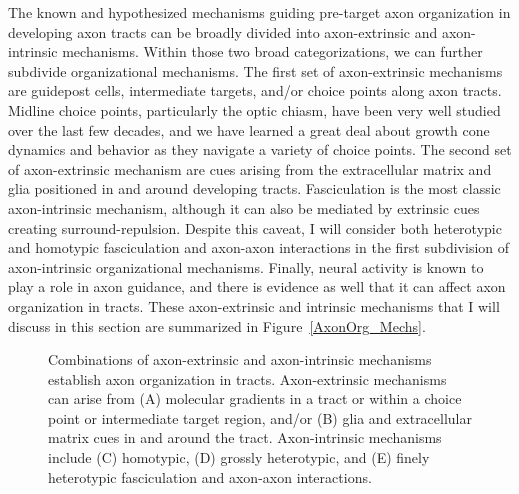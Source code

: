 \label{sec:MoleculesMechanisms}
The known and hypothesized mechanisms guiding pre-target axon organization in developing axon tracts can be broadly divided into axon-extrinsic and axon-intrinsic mechanisms. 
Within those two broad categorizations, we can further subdivide organizational mechanisms.
The first set of axon-extrinsic mechanisms are guidepost cells, intermediate targets, and/or choice points along axon tracts.
Midline choice points, particularly the optic chiasm, have been very well studied over the last few decades, and we have learned a great deal about growth cone dynamics and behavior as they navigate a variety of choice points.
The second set of axon-extrinsic mechanism are cues arising from the extracellular matrix and glia positioned in and around developing tracts.
Fasciculation is the most classic axon-intrinsic mechanism, although it can also be mediated by extrinsic cues creating surround-repulsion.
Despite this caveat, I will consider both heterotypic and homotypic fasciculation and axon-axon interactions in the first subdivision of axon-intrinsic organizational mechanisms.
Finally, neural activity is known to play a role in axon guidance, and there is evidence as well that it can affect axon organization in tracts.
These axon-extrinsic and intrinsic mechanisms that I will discuss in this section are summarized in Figure~\ref{AxonOrg_Mechs}.
\begin{figure}[hbtp]
	\makebox[\textwidth]{\framebox[5cm]{\rule{0pt}{5cm}}}
	\caption[Common Mechanisms of Axon Organization in Tracts]{Combinations of axon-extrinsic and axon-intrinsic mechanisms establish axon organization in tracts. Axon-extrinsic mechanisms can arise from (A) molecular gradients in a tract or within a choice point or intermediate target region, and/or (B) glia and extracellular matrix cues in and around the tract. Axon-intrinsic mechanisms include (C) homotypic, (D) grossly heterotypic, and (E) finely heterotypic fasciculation and axon-axon interactions. \label{AxonOrg_ThreeModes}}
\end{figure}